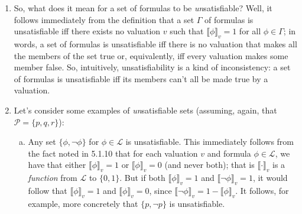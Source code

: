 \begin{enumerate}[\thesection.1]
\begin{enumerate}[(a)]
				\begin{proof}
				Let $\Gamma,\Delta\subseteq\mathcal{L}$ be sets of formulas such that $\Gamma$ is satisfiable and $\Delta\subseteq \Gamma$. That $\Gamma$ is satisfiable means, by definition, that there exists a valuation $v$ such that $\llbracket\phi\rrbracket_v=1$ for all $\phi\in\Gamma$. We need to show that  that there exists a valuation $v'$ such that $\llbracket\psi\rrbracket_{v'}=1$ for all $\psi\in\Delta$. But we can simply let $v'$ be $v$. For let $\psi$ be an arbitrary element of $\Delta$. Since $\Delta\subseteq\Gamma$, we have that $\psi\in\Gamma$. And we have that $\llbracket\phi\rrbracket_v=1$ for all $\phi\in\Gamma$, and so $\llbracket\psi\rrbracket_v=1$. Hence $\llbracket\psi\rrbracket_{v}=1$ for all $\psi\in\Delta$, as desired.
				\end{proof} 
				
				\item The set $\{p\lor\neg p\}$ is satisfiable since (as we proved in 5.2.11) $p\lor\neg p$ is true under \emph{every} valuation.
				
				\item The set $\{p\to q, \neg q\}$ is satisfiable since $v(p)=0,v(q)=0,$ and $v(r)$ arbitrary defines a valuation that makes both $p\to q$ and $\neg q$ true.				
			
			\end{enumerate}
			
		\item So, what does it mean for a set of formulas to be \emph{un}satisfiable? Well, it follows immediately from the definition that a set $\Gamma$ of formulas is unsatisfiable iff there exists no valuation $v$ such that $\llbracket\phi\rrbracket_v=1$ for all $\phi\in\Gamma$; in words, a set of formulas is unsatisfiable iff there is no valuation that makes all the members of the set true or, equivalently, iff every valuation makes some member false. So, intuitively, unsatisfiability is a kind of inconsistency: a set of formulas is unsatisfiable iff its members can't all be made true by a valuation.
		
		\item Let's consider some examples of \emph{un}satisfiable sets (assuming, again, that $\mathcal{P}=\{p,q,r\}$):
		
		\begin{enumerate}[(a)]
		
			\item Any set $\{\phi, \neg \phi\}$ for $\phi\in\mathcal{L}$ is unsatisfiable. This immediately follows from the fact noted in 5.1.10 that for each valuation $v$ and formula $\phi\in\mathcal{L}$, we have that either $\llbracket\phi\rrbracket_v=1$ or $\llbracket\phi\rrbracket_v=0$ (and never both); that is $\llbracket\cdot\rrbracket_v$ is a \emph{function} from $\mathcal{L}$ to $\{0,1\}$. But if both $\llbracket\phi\rrbracket_v=1$ and $\llbracket\neg \phi\rrbracket_v=1$, it would follow that $\llbracket\phi\rrbracket_v=1$ and $\llbracket\phi\rrbracket_v=0$, since $\llbracket\neg\phi\rrbracket_v=1-\llbracket\phi\rrbracket_v$. It follows, for example, more concretely that $\{p,\neg p\}$ is unsatisfiable. 
	

\end{enumerate}
\end{enumerate}
